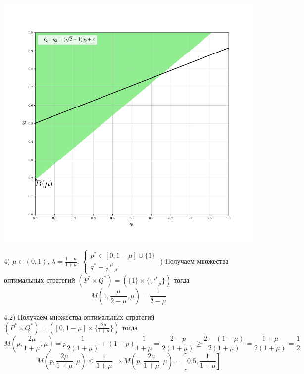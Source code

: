 \documentclass[letterpaper,12pt, reqno]{article}
\begin{document}
\begin{flushleft}
\begin{center}
\includegraphics[scale=0.6]{graf_3_4}
\end{center}
4) $\mu \in (0,1)$, $\lambda=\frac{1-\mu}{1+\mu}$:
$\begin{cases}p^{*} \in [0, 1-\mu] \cup \{1\} \\
q^{*} = \frac{\mu}{2-\mu}
\end{cases}$
\hfill {}) Получаем множества оптимальных стратегий 
$(P^{*} \times Q^{*}) =(\{1\} \times \{\frac{\mu}{2-\mu}\})$ тогда
$$M(1,\frac{\mu}{2-\mu},\mu)=\frac{1}{2-\mu}$$

4.2) Получаем множества оптимальных стратегий 
$(P^{*} \times Q^{*}) =([0,1-\mu] \times \{\frac{2\mu}{1+\mu}\})$ тогда
$$M(p,\frac{2\mu}{1+\mu},\mu)=p\frac{1}{2(1+\mu)}+(1-p)\frac{1}{1+\mu}=\frac{2-p}{2(1+\mu)} \geq
\frac{2 - (1-\mu)}{2(1+\mu)}=\frac{1+\mu}{2(1+\mu)}=\frac{1}{2}$$
$$M(p,\frac{2\mu}{1+\mu},\mu) \leq \frac{1}{1+\mu} \Rightarrow M(p,\frac{2\mu}{1+\mu},\mu) = [0.5, \frac{1}{1+\mu}]$$


\end{flushleft}
\end{document}
